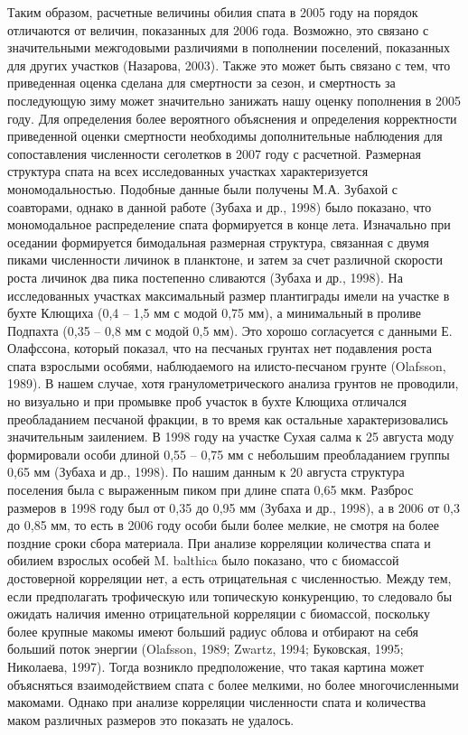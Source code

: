Таким образом, расчетные величины обилия спата в 2005 году на порядок отличаются от величин, показанных для 2006 года. Возможно, это связано с значительными межгодовыми различиями в пополнении поселений, показанных для других участков (Назарова, 2003). Также это может быть связано с тем, что приведенная оценка сделана для смертности за сезон, и смертность за последующую зиму может значительно занижать нашу оценку пополнения в 2005 году. Для определения более вероятного объяснения и определения корректности приведенной оценки смертности необходимы дополнительные наблюдения для сопоставления численности сеголетков в 2007 году с расчетной.
Размерная структура спата на всех исследованных участках характеризуется мономодальностью. Подобные данные были получены М.А. Зубахой с соавторами, однако в данной работе (Зубаха и др., 1998) было показано, что мономодальное распределение спата формируется в конце лета. Изначально при оседании формируется бимодальная размерная структура, связанная с двумя пиками численности личинок в планктоне, и затем за счет различной скорости роста личинок два пика постепенно сливаются (Зубаха и др., 1998).
На исследованных участках максимальный размер плантиграды имели на участке в бухте Клющиха (0,4 – 1,5 мм с модой 0,75 мм), а минимальный в проливе Подпахта (0,35 – 0,8 мм с модой 0,5 мм). Это хорошо согласуется с данными Е. Олафссона, который показал, что на песчаных грунтах нет подавления роста спата взрослыми особями, наблюдаемого на илисто-песчаном грунте (Olafsson, 1989). В нашем случае, хотя гранулометрического анализа грунтов не проводили, но визуально и при промывке проб  участок в бухте Клющиха отличался преобладанием песчаной фракции, в то время как остальные характеризовались значительным заилением. 
В 1998 году на участке Сухая салма к 25 августа моду формировали особи длиной 0,55 – 0,75 мм с небольшим преобладанием группы 0,65 мм (Зубаха и др., 1998). По нашим данным к 20 августа структура поселения была с выраженным пиком при длине спата 0,65 мкм. Разброс размеров в 1998 году был от 0,35 до 0,95 мм (Зубаха и др., 1998), а в 2006 от 0,3 до 0,85 мм, то есть в 2006 году особи были более мелкие, не смотря на более поздние сроки сбора материала. 
При анализе корреляции количества спата и обилием взрослых особей M. balthica было показано, что с биомассой достоверной корреляции нет, а есть отрицательная с численностью. Между тем, если предполагать трофическую или топическую конкуренцию, то следовало бы ожидать наличия именно отрицательной корреляции с биомассой, поскольку более крупные макомы имеют больший радиус облова и отбирают на себя больший поток энергии (Olafsson, 1989; Zwartz, 1994; Буковская, 1995; Николаева, 1997). Тогда возникло предположение, что такая картина может объясняться взаимодействием спата с более мелкими, но более многочисленными макомами. Однако при анализе корреляции численности спата и количества маком различных размеров это показать не удалось.
